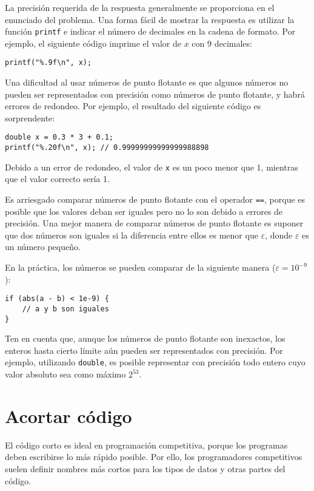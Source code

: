 La precisión requerida de la respuesta
generalmente se proporciona en el enunciado del problema.
Una forma fácil de mostrar la respuesta es utilizar
la función \texttt{printf}
e indicar el número de decimales
en la cadena de formato.
Por ejemplo, el siguiente código imprime
el valor de $x$ con 9 decimales:

\begin{lstlisting}
printf("%.9f\n", x);
\end{lstlisting}

Una dificultad al usar números de punto flotante
es que algunos números no pueden ser representados
con precisión como números de punto flotante,
y habrá errores de redondeo.
Por ejemplo, el resultado del siguiente código
es sorprendente:

\begin{lstlisting}
double x = 0.3 * 3 + 0.1;
printf("%.20f\n", x); // 0.99999999999999988898
\end{lstlisting}

Debido a un error de redondeo,
el valor de \texttt{x} es un poco menor que 1,
mientras que el valor correcto sería 1.

Es arriesgado comparar números de punto flotante
con el operador \texttt{==},
porque es posible que los valores deban ser
iguales pero no lo son debido a errores de precisión.
Una mejor manera de comparar números de punto flotante
es suponer que dos números son iguales
si la diferencia entre ellos es menor que $\varepsilon$,
donde $\varepsilon$ es un número pequeño.

En la práctica, los números se pueden comparar
de la siguiente manera ($\varepsilon=10^{-9}$):

\begin{lstlisting}
if (abs(a - b) < 1e-9) {
    // a y b son iguales
}
\end{lstlisting}

Ten en cuenta que, aunque los números de punto flotante son inexactos,
los enteros hasta cierto límite aún pueden ser
representados con precisión.
Por ejemplo, utilizando \texttt{double},
es posible representar con precisión todo
entero cuyo valor absoluto sea como máximo $2^{53}$.

\section{Acortar código}

El código corto es ideal en programación competitiva,
porque los programas deben escribirse
lo más rápido posible.
Por ello, los programadores competitivos suelen definir
nombres más cortos para los tipos de datos y otras partes del código.

